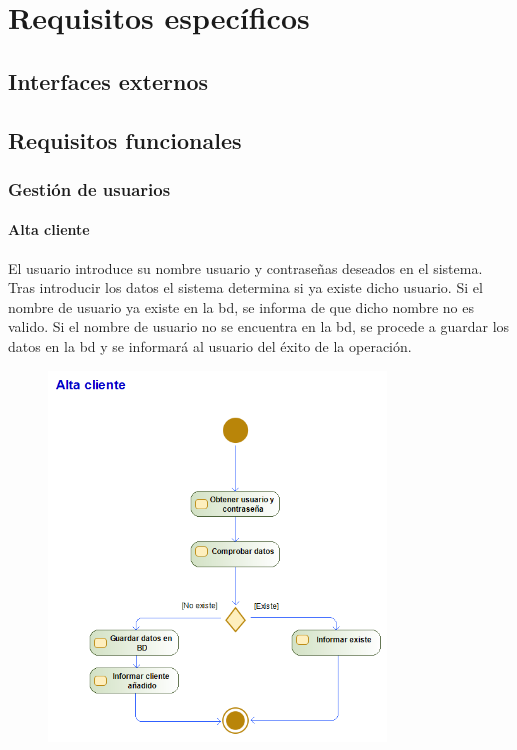 \section{Requisitos específicos}
\subsection{Interfaces externos}
\subsection{Requisitos funcionales}
\subsubsection{Gestión de usuarios}%
\paragraph{Alta cliente}
El usuario introduce su nombre usuario y contraseñas deseados en el sistema. Tras introducir los datos el sistema determina si ya existe dicho usuario. Si el nombre de usuario ya existe en la \gls{bd}, se informa de que dicho nombre no es valido. Si el nombre de usuario no se encuentra en la \gls{bd}, se procede a guardar los datos en la \gls{bd} y se informará al usuario del éxito de la operación.
\begin{figure}[H]
    \centering
    \includegraphics[width=0.8\textwidth]{Use_Cases/alta_cliente.png}
\end{figure}
